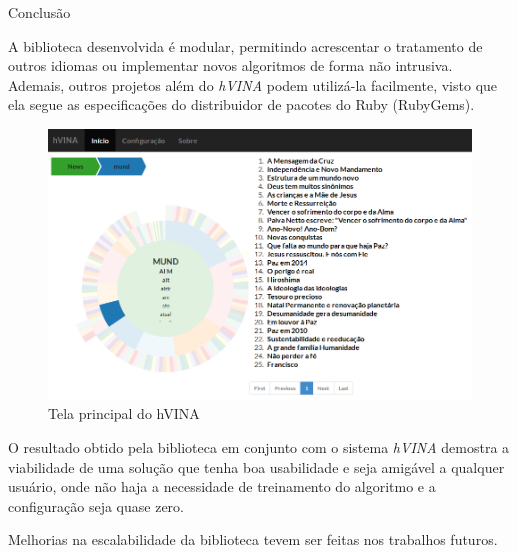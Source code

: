 \documentclass[final]{beamer}
\newlength{\onecolwid}
\begin{document}
\begin{frame}[t]
\begin{columns}[t]
\begin{column}{\onecolwid} %


\begin{block}{Conclusão}

A biblioteca desenvolvida é modular, permitindo acrescentar o tratamento de outros idiomas ou implementar novos algoritmos de forma não intrusiva. Ademais, outros projetos além do \textit{hVINA} podem utilizá-la facilmente, visto que ela segue as especificações do distribuidor de pacotes do Ruby (RubyGems).

\begin{figure}
\includegraphics[width=1\linewidth]{hvina.png}
\caption{Tela principal do hVINA}
\end{figure}

O resultado obtido pela biblioteca em conjunto com o sistema \textit{hVINA} demostra a viabilidade de uma solução que tenha boa usabilidade e seja amigável a qualquer usuário, onde não haja a necessidade de treinamento do algoritmo e a configuração seja quase zero.

Melhorias na escalabilidade da biblioteca tevem ser feitas nos trabalhos futuros.




\end{block}
\end{column}
\end{columns}
\end{frame}
\end{document}
